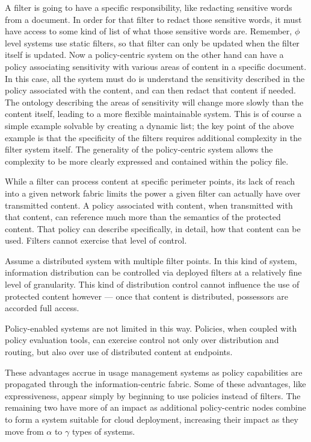 A filter is going to have a specific responsibility, like redacting sensitive words from a document.  In order for that filter to redact those sensitive words, it must have access to some kind of list of what those sensitive words are.  Remember, $\phi$ level systems use static filters, so that filter can only be updated when the filter itself is updated.  Now a policy-centric system on the other hand can have a policy associating sensitivity with various areas of content in a specific document.  In this case, all the system must do is understand the sensitivity described in the policy associated with the content, and can then redact that content if needed.  The ontology describing the areas of sensitivity will change more slowly than the content itself, leading to a more flexible maintainable system.  This is of course a simple example solvable by creating a dynamic list; the key point of the above example is that the specificity of the filters requires additional complexity in the filter system itself.  The generality of the policy-centric system allows the complexity to be more clearly expressed and contained within the policy file.

While a filter can process content at specific perimeter points, its lack of reach into a given network fabric limits the power a given filter can actually have over transmitted content.  A policy associated with content, when transmitted with that content, can reference much more than the semantics of the protected content.  That policy can describe specifically, in detail, how that content can be used.  Filters cannot exercise that level of control.

Assume a distributed system with multiple filter points.  In this kind of system, information distribution can be controlled via deployed filters at a relatively fine level of granularity.  This kind of distribution control cannot influence the use of protected content however --- once that content is distributed, possessors are accorded full access.

Policy-enabled systems are not limited in this way.  Policies, when coupled with policy evaluation tools, can exercise control not only over distribution and routing, but also over use of distributed content at endpoints.

These advantages accrue in usage management systems as policy capabilities are propagated through the information-centric fabric.  Some of these advantages, like expressiveness, appear simply by beginning to use policies instead of filters.  The remaining two have more of an impact as additional policy-centric nodes combine to form a system suitable for cloud deployment, increasing their impact as they move from $\alpha$ to $\gamma$ types of systems.

